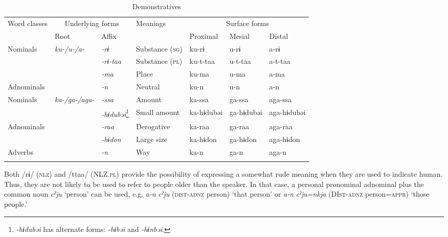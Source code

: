 \begin{sidewaystable}
\caption{\label{tab:key:37}Demonstratives}
\begin{tabular}{lllllll}
\lsptoprule
Word classes  &  \multicolumn{2}{c}{Underlying forms} & Meanings  &  \multicolumn{3}{c}{Surface forms}\\\cmidrule(lr){2-3}\cmidrule(lr){5-7}
              & Root & Affix & & Proximal & Mesial & Distal\\\midrule
Nominals      & \textit{ku-/u-/a-} & \textit{-rɨ}     & Substance (\textsc{sg}) &   ku-rɨ    & u-rɨ    & a-rɨ   \\
              &                    & \textit{-rɨ-taa} & Substance (\textsc{pl}) &   ku-t-taa & u-t-taa & a-t-taa\\
              &                    & \textit{-ma}     & Place          &   ku-ma    & u-ma    & a-ma   \\
Adnominals    &                    & \textit{-n}      & Neutral        &   ku-n     & u-n     & a-n    \\
Nominals      & \textit{ka-/ga-/aga-} & \textit{-ssa} & Amount         &   ka-ssa   & ga-ssa  & aga-ssa\\
              &                       & \textit{-hɨdubəi}\footnote{\textit{{}-hɨdubəi} has alternate forms: \textit{{}-hɨbəi} and \textit{{}-hɨnbəi}.} & Small amount    & ka-hɨdubəi  & ga-hɨdubəi & aga-hɨdubəi\\
Adnominals    &                       & \textit{-raa}     & Derogative   & ka-raa   & ga-raa    & aga-raa  \\
              &                       & \textit{-hɨdon}   & Large size   & ka-hɨdon & ga-hɨdon  & aga-hɨdon\\
Adverbs       &                       & \textit{-n}       & Way          & ka-n     & ga-n      & aga-n    \\
\lspbottomrule
\end{tabular}
\end{sidewaystable}

Both /rɨ/ (\textsc{nlz}) and /ttaa/ (NLZ.\textsc{pl}) provide the possibility of expressing a somewhat rude meaning when they are used to indicate human. Thus, they are not likely to be used to refer to people older than the speaker. In that case, a personal pronominal adnominal plus the common noun \textit{cˀju} ‘person’ can be used, e.g. \textit{a-n} \textit{cˀju} (\textsc{dist}-\textsc{adnz} person) ‘that person’ or \textit{a-n} \textit{cˀju=nkja} (DI\textsc{st}-\textsc{adnz} person=\textsc{appr}) ‘those people.’

